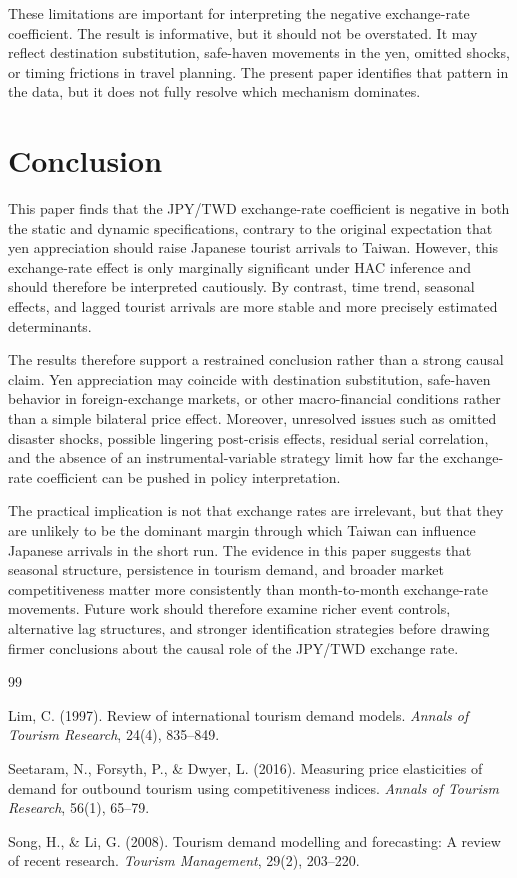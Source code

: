 \documentclass[12pt]{article}
\begin{document}
These limitations are important for interpreting the negative exchange-rate coefficient. The result is informative, but it should not be overstated. It may reflect destination substitution, safe-haven movements in the yen, omitted shocks, or timing frictions in travel planning. The present paper identifies that pattern in the data, but it does not fully resolve which mechanism dominates.

\section{Conclusion}

This paper finds that the JPY/TWD exchange-rate coefficient is negative in both the static and dynamic specifications, contrary to the original expectation that yen appreciation should raise Japanese tourist arrivals to Taiwan. However, this exchange-rate effect is only marginally significant under HAC inference and should therefore be interpreted cautiously. By contrast, time trend, seasonal effects, and lagged tourist arrivals are more stable and more precisely estimated determinants.

The results therefore support a restrained conclusion rather than a strong causal claim. Yen appreciation may coincide with destination substitution, safe-haven behavior in foreign-exchange markets, or other macro-financial conditions rather than a simple bilateral price effect. Moreover, unresolved issues such as omitted disaster shocks, possible lingering post-crisis effects, residual serial correlation, and the absence of an instrumental-variable strategy limit how far the exchange-rate coefficient can be pushed in policy interpretation.

The practical implication is not that exchange rates are irrelevant, but that they are unlikely to be the dominant margin through which Taiwan can influence Japanese arrivals in the short run. The evidence in this paper suggests that seasonal structure, persistence in tourism demand, and broader market competitiveness matter more consistently than month-to-month exchange-rate movements. Future work should therefore examine richer event controls, alternative lag structures, and stronger identification strategies before drawing firmer conclusions about the causal role of the JPY/TWD exchange rate.

\begin{thebibliography}{99}

Lim, C. (1997).
Review of international tourism demand models.
\textit{Annals of Tourism Research}, 24(4), 835--849.

Seetaram, N., Forsyth, P., \& Dwyer, L. (2016).
Measuring price elasticities of demand for outbound tourism using competitiveness indices.
\textit{Annals of Tourism Research}, 56(1), 65--79.

Song, H., \& Li, G. (2008).
Tourism demand modelling and forecasting: A review of recent research.
\textit{Tourism Management}, 29(2), 203--220.

\end{thebibliography}
\end{document}

